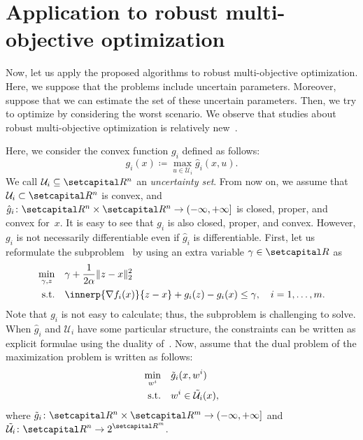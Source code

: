\documentclass[../../main]{subfiles}
\begin{document}
\section{Application to robust multi-objective optimization} 
Now, let us apply the proposed algorithms to robust multi-objective optimization.
Here, we suppose that the problems include uncertain parameters.
Moreover, suppose that we can estimate the set of these uncertain parameters.
Then, we try to optimize by considering the worst scenario.
We observe that studies about robust multi-objective optimization is relatively new~\cite{Ehrgott2014,Fliege2014,Morishita2016}.

Here, we consider the convex function $g_i$ defined as follows:
\begin{equation} \label{eq:g_i}
    g_i(x) \coloneqq \max_{u \in {\mathcal{U}}_i } \hat{g}_i (x,u).
\end{equation}
We call ${\mathcal{U}}_i \subseteq \setR^n$ an \emph{uncertainty set}.
From now on, we assume that~${\mathcal{U}}_i \subset \setR^n$ is convex, and~$\hat{g}_i \colon \setR^n \times \setR^n \to (-\infty, +\infty]$ is closed, proper, and convex for~$x$.
It is easy to see that $g_i$ is also closed, proper, and convex.
However, $g_i$ is not necessarily differentiable even if $\hat{g}_i$ is differentiable.
First, let us reformulate the subproblem~ by using an extra variable $\gamma \in \setR$ as
\begin{equation}
    \begin{aligned}
        \min_{\gamma, z} \quad & \gamma + \frac{1}{2 \alpha}\norm{z - x}_2^2                                        \\
        \st    \quad           & \innerp{\nabla f_i(x)}{z - x} + g_i(z) - g_i(x) \leq \gamma, \quad i = 1,\ldots,m.
    \end{aligned}
\end{equation}
Note that $g_i$ is not easy to calculate; thus, the subproblem is challenging to solve.
When $\hat{g}_i$ and $\mathcal{U}_i$ have some particular structure, the constraints can be written as explicit formulae using the duality of~.
Now, assume that the dual problem of the maximization problem  is written as follows:
\begin{align}
    \min_{w^i} \quad & \tilde{g}_i (x, w^i)               \\
    \mathrm{s.t.}    \quad     & w^i \in \tilde{\mathcal{U}}_i (x),
\end{align}
where $\tilde{g}_i \colon \setR^n \times \setR^m \to (-\infty, +\infty]$ and $\displaystyle \tilde{\mathcal{U}}_i \colon \setR^n \to 2^{\setR^m}$.
\end{document}
